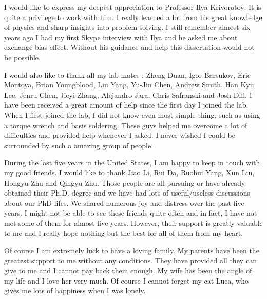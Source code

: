 \acknowledgments
{
  I would like to express my deepest appreciation to Professor Ilya Krivorotov. It is quite a privilege to work with him. I really learned a lot from his great knowledge of physics and sharp insights into problem solving. I still remember almost six years ago I had my first Skype interview with Ilya and he asked me about exchange bias effect. Without his guidance and help this dissertation would not be possible.
  
  I would also like to thank all my lab mates : Zheng Duan, Igor Barsukov, Eric Montoya, Brian Youngblood, Liu Yang, Yu-Jin Chen, Andrew  Smith,  Han Kyu Lee, Jenru Chen, Jieyi Zhang,  Alejandro Jara, Chris Safranski and Josh Dill. I have been received a great amount of help since the first day I joined the lab. When I first joined the lab, I did not know even most simple thing, such as using a torque wrench and basis soldering. These guys helped me overcome a lot of difficulties and provided help whenever I asked. I never wished I could be surrounded by such a amazing group of people.
    
  During the last five years in the United States, I am happy to keep in touch with my good friends. I would like to thank Jiao Li, Rui Da, Ruohui Yang, Xun Liu, Hongyu Zhu and Qingyu Zhu. Those people are all pursuing or have already obtained their Ph.D. degree and we have had lots of useful/useless discussions about our PhD lifes. We shared numerous joy and distress over the past five years. I might not be able to see these friends quite often and in fact, I have not met some of them for almost five years. However, their support is greatly valuable to me and I really hope nothing but the best for all of them from my heart.
  
  Of course I am extremely luck to have a loving family. My parents have been the greatest support to me without any conditions. They have provided all they can give to me and I cannot pay back them enough. My wife has been the angle of my life and I love her very much. Of course I cannot forget my cat Luca, who gives me lots of happiness when I was lonely.
  
}


\newcommand{\mypubentry}[3]{
  \begin{tabular*}{1\textwidth}{@{\extracolsep{\fill}}p{4.5in}r}
    \textbf{#1} & \textbf{#2} \\ 
    \multicolumn{2}{@{\extracolsep{\fill}}p{.95\textwidth}}{#3}\vspace{6pt} \\
  \end{tabular*}
}
\newcommand{\mysoftentry}[3]{
  \begin{tabular*}{1\textwidth}{@{\extracolsep{\fill}}lr}
    \textbf{#1} & \url{#2} \\
    \multicolumn{2}{@{\extracolsep{\fill}}p{.95\textwidth}}
    {\emph{#3}}\vspace{-6pt} \\
  \end{tabular*}
}

